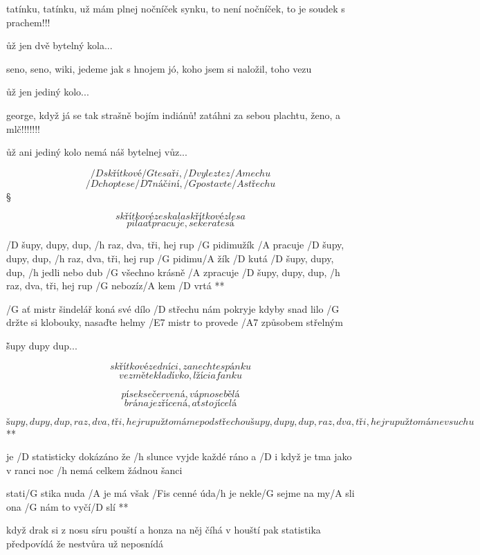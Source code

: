 tatínku, tatínku, už mám plnej nočníček
synku, to není nočníček, to je soudek s prachem!!!

\r už jen dvě bytelný kola...

seno, seno, wiki, jedeme jak s hnojem
jó, koho jsem si naložil, toho vezu

\r už jen jediný kolo...

george, když já se tak strašně bojím indiánů!
zatáhni za sebou plachtu, ženo, a mlč!!!!!!!

\r už ani jediný kolo nemá náš bytelnej vůz...




\[ /D skřítkové /G tesaři, /D vylezte z /A mechu \]
\[ /D chopte se /D7 náčiní, /G postavte /A střechu \] \S

\[ skřítkové ze skal a skřítkové z lesa \]
\[ pila ať pracuje, sekera tesá \]

\R  /D šupy, dupy, dup, /h raz, dva, tři, hej rup
    /G pidimužík /A pracuje
    /D šupy, dupy, dup, /h raz, dva, tři, hej rup
    /G pidimu/A žík /D kutá
    /D šupy, dupy, dup, /h jedli nebo dub
    /G všechno krásně /A zpracuje
    /D šupy, dupy, dup, /h raz, dva, tři, hej rup
    /G nebozíz/A kem /D vrtá **

/G ať mistr šindelář koná své dílo
/D střechu nám pokryje kdyby snad lilo
/G držte si klobouky, nasaďte helmy
/E7 mistr to provede /A7 způsobem střelným

\r šupy dupy dup...

\[ skřítkové zedníci, zanechte spánku \]
\[ vezměte kladívko, lžíci a fanku \] \s

\[ písek se červená, vápno se bělá \]
\[ brána je zřícená, ať stojí celá \]

\R  \[ šupy, dupy, dup, raz, dva, tři, hej rup
    už to máme pod střechou
    šupy, dupy, dup, raz, dva, tři, hej rup
    už to máme v suchu \] **




je /D statisticky dokázáno
že /h slunce vyjde každé ráno
a /D i když je tma jako v ranci
noc /h nemá celkem žádnou šanci

\R  stati/G stika nuda /A je
    má však /Fis cenné úda/h je
    nekle/G sejme na my/A sli
    ona /G nám to vyčí/D slí **

když drak si z nosu síru pouští
a honza na něj číhá v houští
pak statistika předpovídá
že nestvůra už neposnídá

